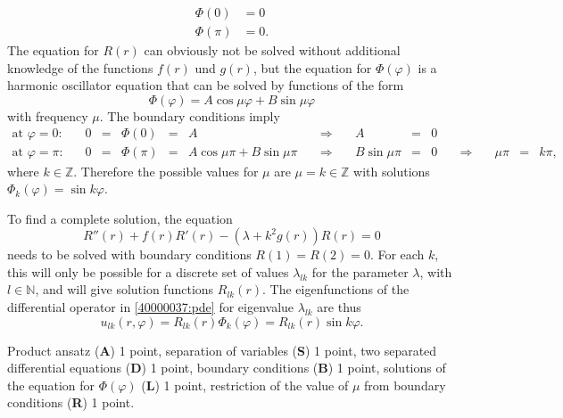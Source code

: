 \begin{loesung}
\[\begin{aligned}
 \Phi(0)   &= 0 \\
 \Phi(\pi) &= 0.
\end{aligned}
\]
The equation for $R(r)$ can obviously not be solved without additional
knowledge of the functions $f(r)$ und $g(r)$, but the equation for
$\Phi(\varphi)$ is a harmonic oscillator equation that can be solved
by functions of the form
\[
\Phi(\varphi)
=
A\cos\mu \varphi + B\sin\mu\varphi
\]
with frequency $\mu$.
The boundary conditions imply
\[
\renewcommand{\arraycolsep}{1.5pt}
\begin{array}{lrccclcrclcrcl}
\text{at $\varphi=0$:}\quad&
0 &=& \Phi(0)   &=& A
&\quad\Rightarrow\quad&
A&=&0
\\
\text{at $\varphi=\pi$:}\quad&
0 &=& \Phi(\pi) &=& A\cos\mu\pi + B \sin\mu\pi
&\quad\Rightarrow\quad&
B\sin\mu\pi &=& 0
&\quad\Rightarrow\quad&
\mu\pi &=& k\pi,
\end{array}
\]
where $k\in\mathbb{Z}$.
Therefore the possible values for $\mu$ are $\mu=k\in\mathbb{Z}$
with solutions $\Phi_k(\varphi)=\sin k\varphi$.
\end{loesung}

\begin{diskussion}
To find a complete solution, the equation
\[
R''(r) + f(r)R'(r) - (\lambda+k^2g(r)) R(r) = 0
\]
needs to be solved with boundary conditions $R(1)=R(2)=0$.
For each $k$, this will only be possible for a discrete set of
values $\lambda_{lk}$ for the parameter $\lambda$, with
$l\in\mathbb{N}$, and will give solution functions $R_{lk}(r)$.
The eigenfunctions of the differential operator in
\eqref{40000037:pde}
for eigenvalue $\lambda_{lk}$ are thus
\[
u_{lk}(r,\varphi)
=
R_{lk}(r)\Phi_k(\varphi)
=
R_{lk}(r)\sin k\varphi.
\]
\end{diskussion}

\begin{bewertung}
Product ansatz ({\bf A}) 1 point,
separation of variables ({\bf S}) 1 point,
two separated differential equations ({\bf D}) 1 point,
boundary conditions ({\bf B}) 1 point,
solutions of the equation for $\Phi(\varphi)$ ({\bf L}) 1 point,
restriction of the value of $\mu$ from boundary conditions ({\bf R}) 1 point.
\end{bewertung}

